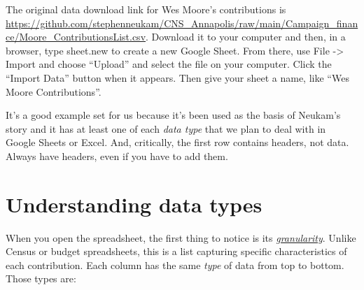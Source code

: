 \documentclass[
  letterpaper,
  DIV=11,
  numbers=noendperiod]{scrreprt}
\begin{document}
The original data download link for Wes Moore's contributions is
\url{https://github.com/stephenneukam/CNS_Annapolis/raw/main/Campaign_finance/Moore_ContributionsList.csv}.
Download it to your computer and then, in a browser, type sheet.new to
create a new Google Sheet. From there, use File -\textgreater{} Import
and choose ``Upload'' and select the file on your computer. Click the
``Import Data'' button when it appears. Then give your sheet a name,
like ``Wes Moore Contributions''.

It's a good example set for us because it's been used as the basis of
Neukam's story and it has at least one of each \emph{data type} that we
plan to deal with in Google Sheets or Excel. And, critically, the first
row contains headers, not data. Always have headers, even if you have to
add them.

\hypertarget{understanding-data-types}{%
\section{Understanding data types}\label{understanding-data-types}}

When you open the spreadsheet, the first thing to notice is its
\href{start-data-def.html}{\emph{granularity}}. Unlike Census or budget
spreadsheets, this is a list capturing specific characteristics of each
contribution. Each column has the same \emph{type} of data from top to
bottom. Those types are:
\end{document}

